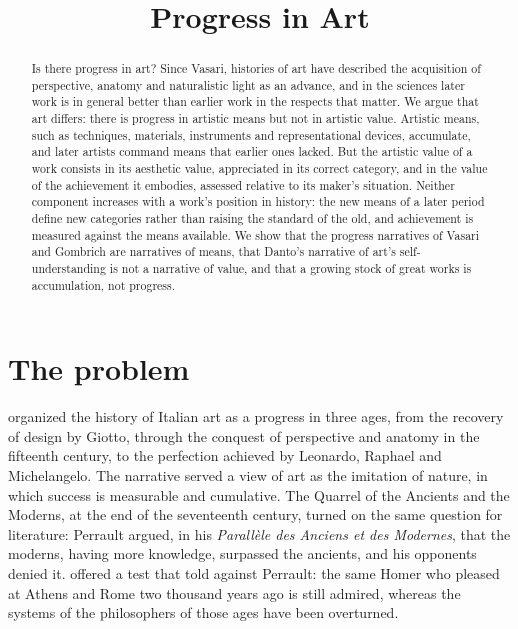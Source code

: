 \documentclass{situationist-preprint}
\title{Progress in Art}
\begin{document}
\maketitle

\begin{abstract}
Is there progress in art? Since Vasari, histories of art have described the acquisition of perspective, anatomy and naturalistic light as an advance, and in the sciences later work is in general better than earlier work in the respects that matter. We argue that art differs: there is progress in artistic means but not in artistic value. Artistic means, such as techniques, materials, instruments and representational devices, accumulate, and later artists command means that earlier ones lacked. But the artistic value of a work consists in its aesthetic value, appreciated in its correct category, and in the value of the achievement it embodies, assessed relative to its maker's situation. Neither component increases with a work's position in history: the new means of a later period define new categories rather than raising the standard of the old, and achievement is measured against the means available. We show that the progress narratives of Vasari and Gombrich are narratives of means, that Danto's narrative of art's self-understanding is not a narrative of value, and that a growing stock of great works is accumulation, not progress.
\end{abstract}

\section{The problem}

\citet{Vasari1568} organized the history of Italian art as a progress in three ages, from the recovery of design by Giotto, through the conquest of perspective and anatomy in the fifteenth century, to the perfection achieved by Leonardo, Raphael and Michelangelo. The narrative served a view of art as the imitation of nature, in which success is measurable and cumulative. The Quarrel of the Ancients and the Moderns, at the end of the seventeenth century, turned on the same question for literature: Perrault argued, in his \emph{Parallèle des Anciens et des Modernes}, that the moderns, having more knowledge, surpassed the ancients, and his opponents denied it. \citet{Hume1757} offered a test that told against Perrault: the same Homer who pleased at Athens and Rome two thousand years ago is still admired, whereas the systems of the philosophers of those ages have been overturned.
\end{document}
